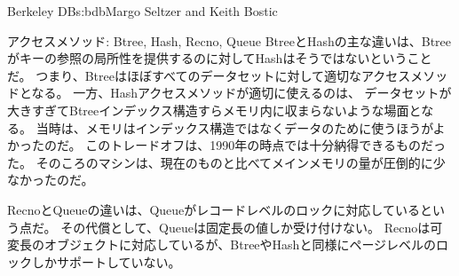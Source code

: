 \begin{aosachapter}{Berkeley DB}{s:bdb}{Margo Seltzer and Keith Bostic}
\begin{aosasect1}{アクセスメソッド: Btree, Hash, Recno, Queue}
BtreeとHashの主な違いは、Btreeがキーの参照の局所性を提供するのに対してHashはそうではないということだ。
つまり、Btreeはほぼすべてのデータセットに対して適切なアクセスメソッドとなる。
一方、Hashアクセスメソッドが適切に使えるのは、
データセットが大きすぎてBtreeインデックス構造すらメモリ内に収まらないような場面となる。
当時は、メモリはインデックス構造ではなくデータのために使うほうがよかったのだ。
このトレードオフは、1990年の時点では十分納得できるものだった。
そのころのマシンは、現在のものと比べてメインメモリの量が圧倒的に少なかったのだ。

RecnoとQueueの違いは、Queueがレコードレベルのロックに対応しているという点だ。
その代償として、Queueは固定長の値しか受け付けない。
Recnoは可変長のオブジェクトに対応しているが、BtreeやHashと同様にページレベルのロックしかサポートしていない。


\end{aosasect1}
\end{aosachapter}
